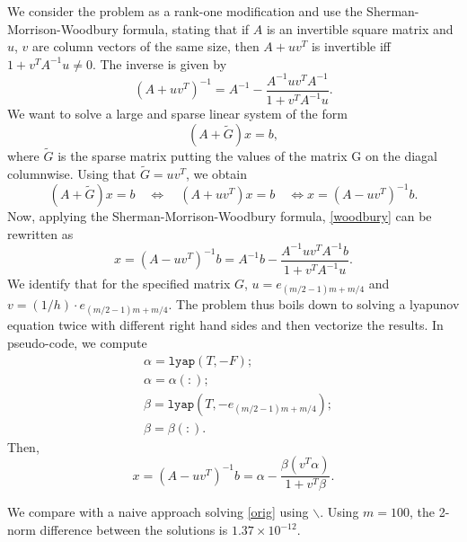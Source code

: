 We consider the problem as a rank-one modification and use the Sherman-Morrison-Woodbury formula, stating that if $A$ is an invertible square matrix and $u$, $v$ are column vectors of the same size, then $A+uv^T$ is invertible iff $1+v^TA^{-1}u\neq 0$. The inverse is given by
\begin{equation}
(A+uv^T)^{-1} = A^{-1}-\frac{A^{-1}uv^TA^{-1}}{1+v^TA^{-1}u}.
\end{equation}
We want to solve a large and sparse linear system of the form
\begin{equation}\label{orig}
(A+\tilde{G})x = b,
\end{equation}
where $\tilde{G}$ is the sparse matrix putting the values of the matrix G on the diagal columnwise.
Using that $\tilde{G} = uv^T$, we obtain
\begin{equation}\label{woodbury}
(A+\tilde{G})x = b\quad\Leftrightarrow\quad (A+uv^T)x = b
\quad\Leftrightarrow x=(A-uv^T)^{-1}b.
\end{equation}
Now, applying the Sherman-Morrison-Woodbury formula, \eqref{woodbury} can be rewritten as
\begin{equation}
x=(A-uv^T)^{-1}b = A^{-1}b-\frac{A^{-1}uv^TA^{-1}b}{1+v^TA^{-1}u}.
\end{equation}
We identify that for the specified matrix $G$, $u =e_{(m/2-1)m+m/4}$ and $v = (1/h)\cdot e_{(m/2-1)m+m/4}$. The problem thus boils down to solving a lyapunov equation twice with different right hand sides and then vectorize the results. In pseudo-code, we compute
\begin{equation}
\begin{aligned}
&\alpha = \texttt{lyap}(T,-F);\\
&\alpha = \alpha(:);\\
&\beta = \texttt{lyap}(T,-e_{(m/2-1)m+m/4});\\
&\beta = \beta(:).
\end{aligned}
\end{equation}
Then,
\begin{equation}
x=(A-uv^T)^{-1}b  = \alpha -\frac{\beta(v^T\alpha)}{1+v^T\beta}.
\end{equation}

We compare with a naive approach solving \eqref{orig} using $\backslash$. Using $m=100$, the 2-norm difference between the solutions is $1.37\times 10^{-12}$.

